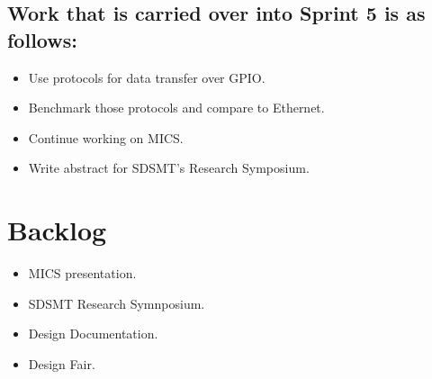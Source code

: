 \documentclass{article}
\begin{document}
\subsection*{Work that is carried over into Sprint 5 is as follows:}
\begin{itemize}
	\item Use protocols for data transfer over GPIO.
	\item Benchmark those protocols and compare to Ethernet.
	\item Continue working on MICS.
	\item Write abstract for SDSMT's Research Symposium.
\end{itemize}

\section*{Backlog}
\begin{itemize}
	\item MICS presentation.
	\item SDSMT Research Symnposium. 
	\item Design Documentation.
	\item Design Fair.
\end{itemize}
\end{document}
